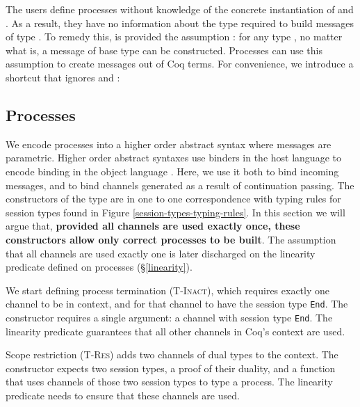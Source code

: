 \documentclass{mproj}
\newcommand{\type}{\texttt}
\newcommand{\End}{\type{End}}
\begin{document}
The users define processes without knowledge of the concrete instantiation of  and . As a result, they have no information about the type  required to build messages of type . To remedy this,  is provided the assumption : for any type , no matter what  is, a message of base type  can be constructed. Processes can use this assumption to create messages out of Coq terms. For convenience, we introduce a shortcut that ignores  and :


\subsection{Processes}\label{processes}

We encode processes into a higher order abstract syntax where messages are parametric. Higher order abstract syntaxes use binders in the host language to encode binding in the object language \cite{Chlipala2008}. Here, we use it both to bind incoming messages, and to bind channels generated as a result of continuation passing. The constructors of the  type are in one to one correspondence with typing rules for session types found in Figure \ref{session-types-typing-rules}. In this section we will argue that, \textbf{provided all channels are used exactly once, these constructors allow only correct processes to be built}. The assumption that all channels are used exactly one is later discharged on the linearity predicate defined on processes (\S \ref{linearity}).

We start defining process termination (\textsc{T-Inact}), which requires exactly one channel to be in context, and for that channel to have the session type \End. The constructor  requires a single argument: a channel with session type \End. The linearity predicate guarantees that all other channels in Coq's context are used.


Scope restriction (\textsc{T-Res}) adds two channels of dual types to the context. The constructor  expects two session types, a proof of their duality, and a function that uses channels of those two session types to type a process. The linearity predicate needs to ensure that these channels are used.
\end{document}

